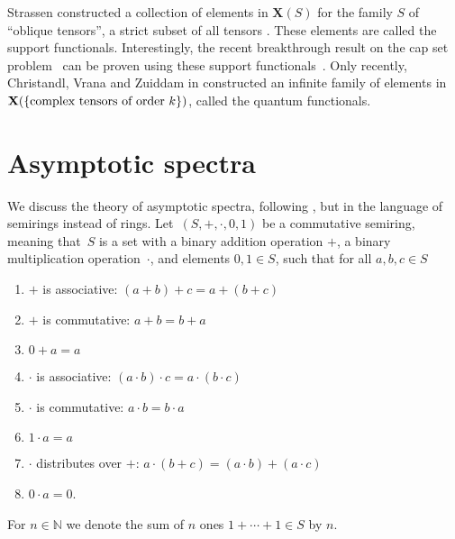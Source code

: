\documentclass[a4paper, fleqn]{amsart}
\theoremstyle{plain}
\theoremstyle{definition}
\newcommand{\NN}{\mathbb{N}}
\newcommand{\jeroen}[1]{#1}
\newcommand{\semiring}[1]{#1}
\newcommand{\aspec}{\mathbf{X}}
\begin{document}
Strassen constructed a collection of elements in $\aspec(\semiring{S})$ for the family $\semiring{S}$ of ``oblique tensors'', a strict subset of all tensors \cite{strassen1991degeneration}. These elements are called the support functionals.
Interestingly, the recent breakthrough result on the cap set problem~\cite{MR3583358,tao} can be proven using these support functionals~\cite{christandl2017universalproc}.
Only recently, Christandl, Vrana and Zuiddam in \cite{christandl2017universalproc} constructed an infinite family of elements in $\aspec(\{\textnormal{complex tensors of order $k$}\})$, called the quantum functionals.


\section{Asymptotic spectra}
We discuss the theory of asymptotic spectra, following \cite{strassen1988asymptotic}, \jeroen{but in the language of semirings instead of rings.}
Let~$(S, +, \cdot, 0, 1)$ be a commutative semiring, meaning that~$S$ is a set with a binary addition operation $+$, a binary multiplication operation~$\cdot$, and elements $0,1\in S$, such that for all $a,b,c \in S$
\begin{enumerate}[label=\upshape(\arabic*)]
\item $+$ is associative: $(a+b)+c = a + (b+c)$
\item $+$ is commutative: $a+b = b+a$
\item $0+a = a$
\item $\cdot$ is associative: $(a\cdot b)\cdot c = a \cdot (b \cdot c)$
\item $\cdot$ is commutative: $a\cdot b = b \cdot a$
\item $1\cdot a = a$
\item $\cdot$ distributes over $+$: $a\cdot (b+c) = (a\cdot b) + (a \cdot c)$
\item $0 \cdot a = 0$.
\end{enumerate}
For $n \in \NN$ we denote the sum of $n$ ones $1 + \cdots + 1 \in S$ by $n$.
%
%
%
%
%
%
%
%
%
%
%
\end{document}
